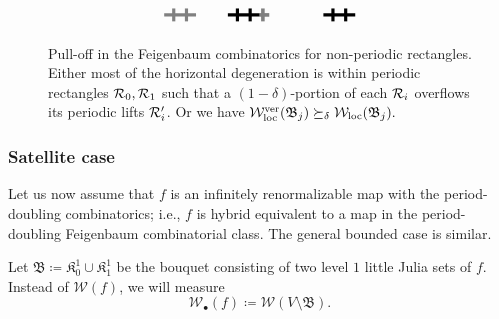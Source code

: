 \documentclass{amsart}
\newcommand{\filled}{{\mathfrak K }}
\newcommand{\bush}{{\mathfrak B }}
\newcommand{\1}{{\mathbb 1 }}
\newcommand{\Width}{{\mathcal W}}
\begin{document}
\begin{figure}[t!]
\[\begin{tikzpicture}[scale=0.8]
\begin{scope}[shift={(0,-3)}]
  
\begin{scope}[gray,shift={(9,0)}]
\draw[line width=0.8mm] (-0.5,0)--(0.5,0); 
\draw[line width=0.8mm] (-0.2,-0.2)--(-0.2,0.2);
\draw[line width=0.8mm] (0.2,-0.2)--(0.2,0.2);
  \end{scope}

\begin{scope}[shift={(11,0)}]
\draw[line width=0.8mm] (-0.5,0)--(0.5,0); 
\draw[line width=0.8mm] (-0.2,-0.2)--(-0.2,0.2);
\draw[line width=0.8mm] (0.2,-0.2)--(0.2,0.2);
\draw[line width=0.9mm,gray] (0.5,0) -- (0.8,0); 
\draw[line width=0.9mm,gray] (0.6,-0.2) -- (0.6,0.2); 
  \end{scope}
  
  \begin{scope}[shift={(14,0)}]
\draw[line width=0.8mm] (-0.5,0)--(0.5,0); 

\draw[line width=0.8mm] (-0.2,-0.2)--(-0.2,0.2);
\draw[line width=0.8mm] (0.2,-0.2)--(0.2,0.2);

  \end{scope}


\end{scope}
\end{tikzpicture}\]

\caption{Pull-off in the Feigenbaum combinatorics for non-periodic
  rectangles. Either most of the horizontal degeneration is within periodic rectangles ${\mathcal R}_0,{\mathcal R}_1$
  such that a $(1-\delta)$-portion of each ${\mathcal R}_i$ overflows its periodic lifts ${\mathcal R}'_i$. Or we have $\Width^\ver_\loc(\bush_j)\succeq_\delta \Width_\loc(\bush_j).$}
\label{Fg:Pull off:Feigen Comb}
\end{figure}




\subsubsection{Satellite case}\label{ss:intro:SatCase} Let us now assume that $f$ is an infinitely renormalizable map with the period-doubling combinatorics; i.e., $f$ is hybrid equivalent to a map in the period-doubling Feigenbaum combinatorial class. The general bounded case is similar.

Let $\bush\coloneqq \filled^1_0\cup \filled^1_1$ be the bouquet consisting of two level $1$ little Julia sets of $f$. Instead of $\Width(f)$, we will measure
\[\Width_\bullet(f)\coloneqq \Width(V\setminus \bush).\]
\end{document}
